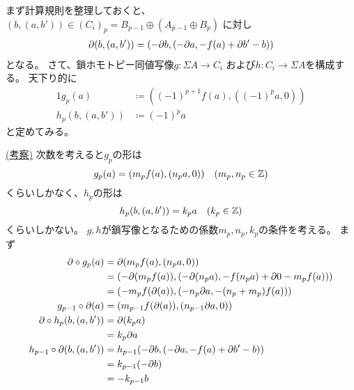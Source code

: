\documentclass[report]{jlreq}
\begin{document}
\begin{answer}
    まず計算規則を整理しておくと、
    $(b, (a, b')) \in (C_i)_p = B_{p - 1} \oplus (A_{p - 1} \oplus B_{p})$
    に対し
    \begin{alignat}{1}
        \partial (b, (a, b')) = (- \partial b, (- \partial a, - f(a) + \partial b' - b))
    \end{alignat}
    となる。
    さて、鎖ホモトピー同値写像$g \colon \Sigma A \to C_i$
    および$h \colon C_i \to \Sigma A$を構成する。
    天下り的に
    \begin{alignat}{1}
        g_{p}(a) &\coloneqq ((-1)^{p + 1} f(a), ((-1)^{p} a, 0)) \\
        h_{p}(b, (a, b')) &\coloneqq (-1)^{p} a
    \end{alignat}
    と定めてみる。
    \begin{innerproof}
        \uline{(考察)} \quad
        次数を考えると$g_p$の形は
        \begin{equation}
            g_{p}(a) = (m_p f(a), (n_p a, 0))
                \quad (m_p, n_p \in \mathbb{Z})
        \end{equation}
        くらいしかなく、$h_p$の形は
        \begin{equation}
            h_{p}(b, (a, b')) = k_p a
                \quad (k_p \in \mathbb{Z})
        \end{equation}
        くらいしかない。
        $g, h$が鎖写像となるための係数$m_p, n_p, k_p$の条件を考える。
        まず
        \begin{alignat}{1}
            \partial \circ g_p (a)
                &= \partial (m_p f(a), (n_p a, 0)) \\
                &= (- \partial (m_p f(a)), (- \partial (n_p a), - f(n_p a) + \partial 0 - m_p f(a))) \\
                &= (- m_p f (\partial (a)), (- n_p \partial a, - (n_p + m_p) f(a))) \\
            g_{p - 1} \circ \partial (a)
                &= (m_{p - 1} f(\partial (a)), (n_{p - 1} \partial a, 0)) \\
            \partial \circ h_p (b, (a, b'))
                &= \partial (k_p a) \\
                &= k_p \partial a \\
            h_{p - 1} \circ \partial (b, (a, b'))
                &= h_{p - 1} (- \partial b, (- \partial a, - f(a) + \partial b' - b)) \\
                &= k_{p - 1} (- \partial b) \\
                &= - k_{p - 1} b
        \end{alignat}

\end{innerproof}
\end{answer}
\end{document}
